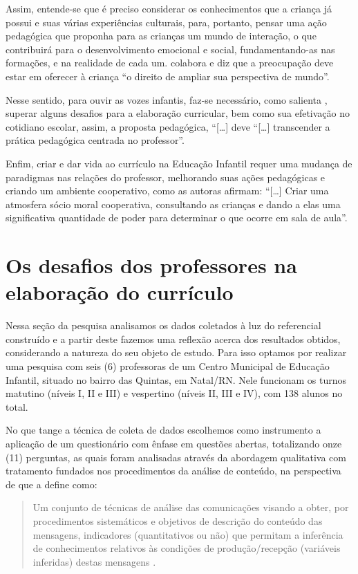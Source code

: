 \begin{refsection}
    Assim, entende-se que é preciso considerar os conhecimentos que a criança já possui e suas várias experiências culturais, para, portanto, pensar uma ação pedagógica que proponha para as crianças um mundo de interação, o que contribuirá para o desenvolvimento emocional e social, fundamentando-as nas formações, e na realidade de cada um. \textcite{OLIVEIRA2013Novas} colabora e diz que a preocupação deve estar em oferecer à criança “o direito de ampliar sua perspectiva de mundo”. 

    Nesse sentido, para ouvir as vozes infantis, faz‐se necessário, como salienta \textcite[p.~6]{OLIVEIRA2013Novas}, superar alguns desafios para a elaboração curricular, bem como sua efetivação no cotidiano escolar, assim, a proposta pedagógica, “[\dots] deve “[\dots] transcender a prática pedagógica centrada no professor”. 

    Enfim, criar e dar vida ao currículo na Educação Infantil requer uma mudança de paradigmas nas relações do professor, melhorando suas ações pedagógicas e criando um ambiente cooperativo, como as autoras \textcite[p.~51]{DEVRIESAndZAN2004currículo} afirmam: “[\dots] Criar uma atmosfera sócio moral cooperativa, consultando as crianças e dando a elas uma significativa quantidade de poder para determinar o que ocorre em sala de aula”.  


    \section{Os desafios dos professores na elaboração do currículo}

    Nessa seção da pesquisa analisamos os dados coletados à luz do referencial construído e a partir deste fazemos uma reflexão acerca dos resultados obtidos, considerando a natureza do seu objeto de estudo. Para isso optamos por realizar uma pesquisa com seis (6) professoras de um Centro Municipal de Educação Infantil, situado no bairro das Quintas, em Natal/RN. Nele funcionam os turnos matutino (níveis I, II e III) e vespertino (níveis II, III e IV), com 138 alunos no total. 

    No que tange a técnica de coleta de dados escolhemos como instrumento a aplicação de um questionário com ênfase em questões abertas, totalizando onze (11) perguntas, as quais foram analisadas através da abordagem qualitativa com tratamento fundados nos procedimentos da análise de conteúdo, na perspectiva de \textcite{BARDIN2011Análise} que a define como: 

    \begin{quotation}
        Um conjunto de técnicas de análise das comunicações visando a obter, por procedimentos sistemáticos e objetivos de descrição do conteúdo das mensagens, indicadores (quantitativos ou não) que permitam a inferência de conhecimentos relativos às condições de produção/recepção (variáveis inferidas) destas mensagens \cite[p.~47]{BARDIN2011Análise}.  
    \end{quotation}


\end{refsection}
